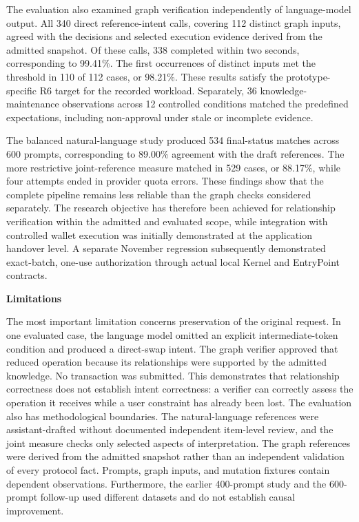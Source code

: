 The evaluation also examined graph verification independently of
language-model output. All 340 direct reference-intent calls, covering
112 distinct graph inputs, agreed with the decisions and selected
execution evidence derived from the admitted snapshot. Of these calls,
338 completed within two seconds, corresponding to 99.41\%. The first
occurrences of distinct inputs met the threshold in 110 of 112 cases,
or 98.21\%. These results satisfy the prototype-specific R6 target for
the recorded workload. Separately, 36 knowledge-maintenance observations
across 12 controlled conditions matched the predefined expectations,
including non-approval under stale or incomplete evidence.

The balanced natural-language study produced 534 final-status matches
across 600 prompts, corresponding to 89.00\% agreement with the draft
references. The more restrictive joint-reference measure matched in
529 cases, or 88.17\%, while four attempts ended in provider quota errors.
These findings show that the complete pipeline remains less reliable
than the graph checks considered separately. The research objective
has therefore been achieved for relationship verification within the
admitted and evaluated scope, while integration with controlled wallet
execution was initially demonstrated at the application handover level.
A separate November regression subsequently demonstrated exact-batch,
one-use authorization through actual local Kernel and EntryPoint contracts.

\medskip
\noindent\textbf{Limitations}

The most important limitation concerns preservation of the original
request. In one evaluated case, the language model omitted an explicit
intermediate-token condition and produced a direct-swap intent. The
graph verifier approved that reduced operation because its relationships
were supported by the admitted knowledge. No transaction was submitted.
This demonstrates that relationship correctness does not establish
intent correctness: a verifier can correctly assess the operation it
receives while a user constraint has already been lost. The evaluation also has methodological boundaries. The natural-language
references were assistant-drafted without documented independent
item-level review, and the joint measure checks only selected aspects
of interpretation. The graph references were derived from the admitted
snapshot rather than an independent validation of every protocol fact.
Prompts, graph inputs, and mutation fixtures contain dependent
observations. Furthermore, the earlier 400-prompt study and the
600-prompt follow-up used different datasets and do not establish
causal improvement.

